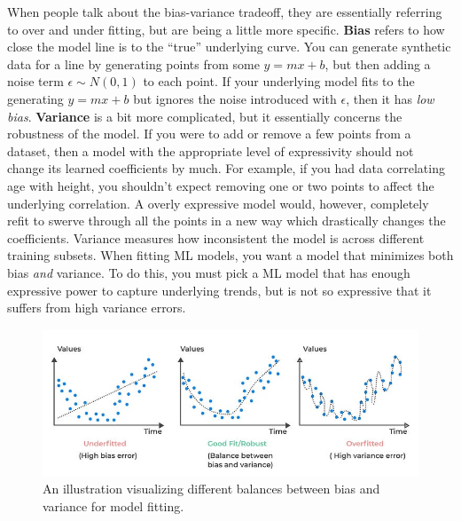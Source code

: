 \begin{flushleft}
    When people talk about the bias-variance tradeoff, they are essentially referring to over and under fitting, but are being a little more specific. \textbf{Bias} refers to how close the model line is to the ``true'' underlying curve. You can generate synthetic data for a line by generating points from some $y = mx +b$, but then adding a noise term $\epsilon \sim N(0, 1)$ to each point. If your underlying model fits to the generating $y = mx+b$ but ignores the noise introduced with $\epsilon$, then it has \textit{low bias}. \textbf{Variance} is a bit more complicated, but it essentially concerns the robustness of the model. If you were to add or remove a few points from a dataset, then a model with the appropriate level of expressivity should not change its learned coefficients by much. For example, if you had data correlating age with height, you shouldn't expect removing one or two points to affect the underlying correlation. A overly expressive model would, however, completely refit to swerve through all the points in a new way which drastically changes the coefficients. Variance measures how inconsistent the model is across different training subsets. When fitting ML models, you want a model that minimizes both bias \textit{and} variance. To do this, you must pick a ML model that has enough expressive power to capture underlying trends, but is not so expressive that it suffers from high variance errors. 

    \begin{figure}[H]
        \centering
        \includegraphics[width=0.8\linewidth]{ml/biasvariance.jpg}
        \caption{An illustration visualizing different balances between bias and variance for model fitting.}
        \label{fig:biasvariance}
    \end{figure}
\end{flushleft}

